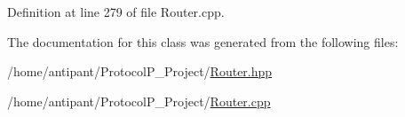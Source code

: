 Definition at line 279 of file Router.\-cpp.



The documentation for this class was generated from the following files\-:\begin{DoxyCompactItemize}
\item 
/home/antipant/\-Protocol\-P\-\_\-\-Project/\hyperlink{Router_8hpp}{Router.\-hpp}\item 
/home/antipant/\-Protocol\-P\-\_\-\-Project/\hyperlink{Router_8cpp}{Router.\-cpp}\end{DoxyCompactItemize}
